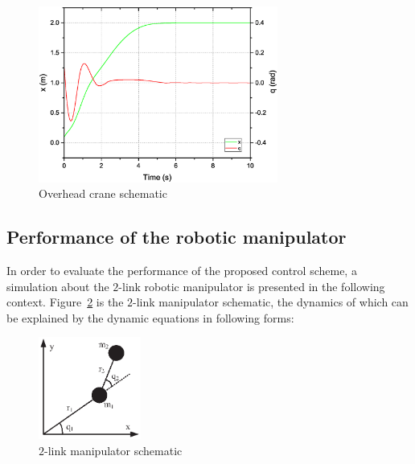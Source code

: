 \documentclass[3p]{elsarticle}
\theoremstyle{plain}
\theoremstyle{remark}
\begin{document}
\begin{figure}
\centering
\includegraphics[width=0.7\textwidth]{paper3_fig9.eps}
\caption{Overhead crane schematic}
\label{Figure:9}
\end{figure}
\subsection{Performance of the robotic manipulator}
In order to evaluate the performance of the proposed control scheme, a simulation about the $2$-link robotic manipulator is presented in the following context. Figure~\ref{Figure:1} is the $2$-link manipulator schematic, the dynamics of which can be explained by the dynamic equations in following forms:
\begin{figure}
\centering
\includegraphics[width=0.3\textwidth]{paper3_fig1.eps}
\caption{$2$-link manipulator schematic}
\label{Figure:1}
\end{figure}
\end{document}
